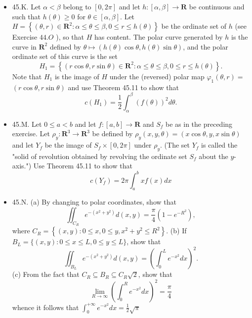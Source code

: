 \begin{itemize}
\item 45.K. Let $\alpha<\beta$ belong to $[0,2 \pi]$ and let $h:[\alpha, \beta] \rightarrow \mathbf{R}$ be continuous and such that $h(\theta) \geq 0$ for $\theta \in[\alpha, \beta]$. Let $H=\left\{(\theta, r) \in \boldsymbol{R}^2: \alpha \leq \theta \leq \beta, 0 \leq r \leq h(\theta)\right\}$ be the ordinate set of $h$ (see Exercise $44 . O$ ), so that $H$ has content. The polar curve generated by $h$ is the curve in $\boldsymbol{R}^2$ defined by $\theta \mapsto(h(\theta) \cos \theta, h(\theta) \sin \theta)$, and the polar ordinate set of this curve is the set
\[
H_1=\left\{(r \cos \theta, r \sin \theta) \in \mathbf{R}^2: \alpha \leq \theta \leq \beta, 0 \leq r \leq h(\theta)\right\} .
\]
Note that $H_1$ is the image of $H$ under the (reversed) polar map $\varphi_1(\theta, r)=$ $(r \cos \theta, r \sin \theta)$ and use Theorem 45.11 to show that
\[
c\left(H_1\right)=\frac{1}{2} \int_\alpha^\beta(f(\theta))^2 d \theta .
\]
\item 45.M. Let $0 \leq a<b$ and let $f:[a, b] \rightarrow \boldsymbol{R}$ and $S_f$ be as in the preceding exercise. Let $\rho_y: \mathbf{R}^3 \rightarrow \boldsymbol{R}^3$ be defined by $\rho_y(x, y, \theta)=(x \cos \theta, y, x \sin \theta)$ and let $Y_f$ be the image of $S_f \times[0,2 \pi]$ under $\rho_y$. (The set $Y_f$ is called the "solid of revolution obtained by revolving the ordinate set $S_f$ about the $y$-axis.") Use Theorem 45.11 to show that
\[
c\left(Y_f\right)=2 \pi \int_a^b x f(x) d x
\]
\item 45.N. (a) By changing to polar coordinates, show that
\[
\iint_{C_R} e^{-\left(x^2+y^2\right)} d(x, y)=\frac{\pi}{4}\left(1-e^{-R^2}\right),
\]
where $C_R=\left\{(x, y): 0 \leq x, 0 \leq y, x^2+y^2 \leq R^2\right\}$.
(b) If $B_L=\{(x, y): 0 \leq x \leq L, 0 \leq y \leq L\}$, show that
\[
\iint_{B_L} e^{-\left(x^2+y^2\right)} d(x, y)=\left(\int_0^L e^{-x^2} d x\right)^2 .
\]
(c) From the fact that $C_R \subseteq B_R \subseteq C_R \sqrt{2}$, show that
\[
\lim _{R \rightarrow \infty}\left(\int_0^R e^{-x^2} d x\right)^2=\frac{\pi}{4}
\]
whence it follows that $\int_0^{+\infty} e^{-x^2} d x=\frac{1}{2} \sqrt{\pi}$
\end{itemize}
